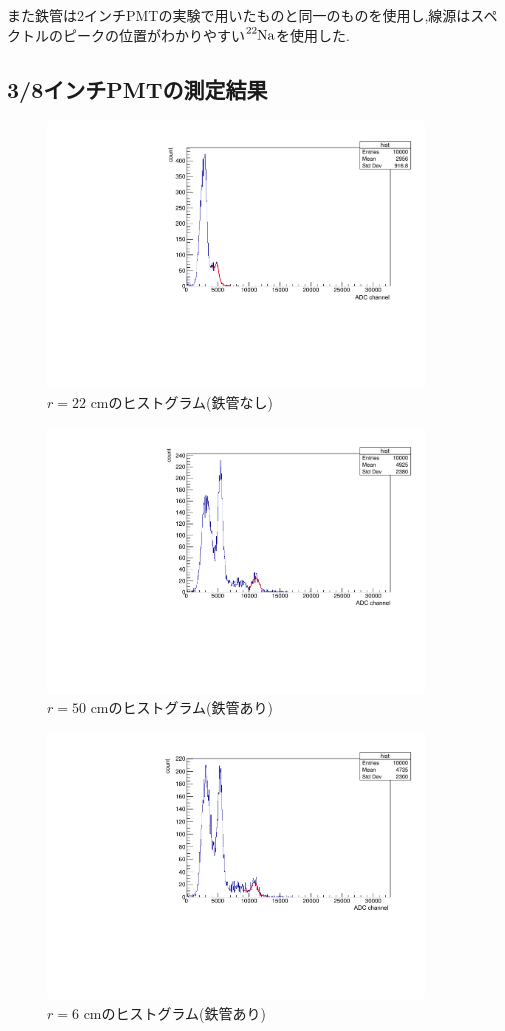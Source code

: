 また鉄管は2インチPMTの実験で用いたものと同一のものを使用し,線源はスペクトルのピークの位置がわかりやすい$\ce{^{22}Na}$を使用した.


\subsection{3/8インチPMTの測定結果}

\begin{figure}[h]
	\centering
		\includegraphics[angle=-90,width=10cm]{fig/iguchi/minicoout22.pdf}
	\caption{$r=22$ cmのヒストグラム(鉄管なし)}
	\label{histminicoout22}
\end{figure}

\begin{figure}[h]
	\centering
		\includegraphics[angle=-90,width=10cm]{fig/iguchi/minicoin22.pdf}
	\caption{$r=50$ cmのヒストグラム(鉄管あり)}
	\label{histminicoin22}
\end{figure}

\begin{figure}[h]
	\centering
		\includegraphics[angle=-90,width=10cm]{fig/iguchi/minicoin21.pdf}
	\caption{$r=6$ cmのヒストグラム(鉄管あり)}
	\label{histminicoin21}
\end{figure}

